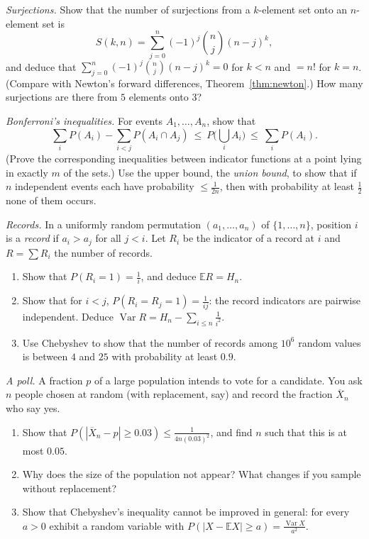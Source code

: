 \begin{exercise}[$\star\star$]\label{ex:surj}
\emph{Surjections.} Show that the number of surjections from a $k$-element set onto an $n$-element set is
\[
S(k,n)=\sum_{j=0}^n(-1)^j\binom nj(n-j)^k ,
\]
and deduce that $\sum_{j=0}^n(-1)^j\binom nj(n-j)^k=0$ for $k<n$ and $=n!$ for $k=n$. (Compare with Newton's forward differences, Theorem~\ref{thm:newton}.) How many surjections are there from $5$ elements onto $3$?
\end{exercise}

\begin{exercise}[$\star\star$]\label{ex:bonferroni}
\emph{Bonferroni's inequalities.} For events $A_1,\dots,A_n$, show that
\[
\sum_iP(A_i)-\sum_{i<j}P(A_i\cap A_j)\ \le\ P\Big(\bigcup_iA_i\Big)\ \le\ \sum_iP(A_i).
\]
(Prove the corresponding inequalities between indicator functions at a point lying in exactly $m$ of the sets.) Use the upper bound, the \emph{union bound}, to show that if $n$ independent events each have probability $\le\frac1{2n}$, then with probability at least $\frac12$ none of them occurs.
\end{exercise}

\begin{exercise}[$\star\star$]\label{ex:records}
\emph{Records.} In a uniformly random permutation $(a_1,\dots,a_n)$ of $\{1,\dots,n\}$, position $i$ is a \emph{record} if $a_i>a_j$ for all $j<i$. Let $R_i$ be the indicator of a record at $i$ and $R=\sum R_i$ the number of records.
\begin{enumerate}[label=(\alph*)]
\item Show that $P(R_i=1)=\frac1i$, and deduce $\mathbb ER=H_n$.
\item Show that for $i<j$, $P(R_i=R_j=1)=\frac1{ij}$: the record indicators are pairwise independent. Deduce $\operatorname{Var}R=H_n-\sum_{i\le n}\frac1{i^2}$.
\item Use Chebyshev to show that the number of records among $10^6$ random values is between $4$ and $25$ with probability at least $0.9$.
\end{enumerate}
\end{exercise}

\begin{exercise}[$\star\star$]\label{ex:poll}
\emph{A poll.} A fraction $p$ of a large population intends to vote for a candidate. You ask $n$ people chosen at random (with replacement, say) and record the fraction $\overline X_n$ who say yes.
\begin{enumerate}[label=(\alph*)]
\item Show that $P(|\overline X_n-p|\ge0.03)\le\frac1{4n(0.03)^2}$, and find $n$ such that this is at most $0.05$.
\item Why does the size of the population not appear? What changes if you sample without replacement?
\item Show that Chebyshev's inequality cannot be improved in general: for every $a>0$ exhibit a random variable with $P(|X-\mathbb EX|\ge a)=\frac{\operatorname{Var}X}{a^2}$.
\end{enumerate}
\end{exercise}

